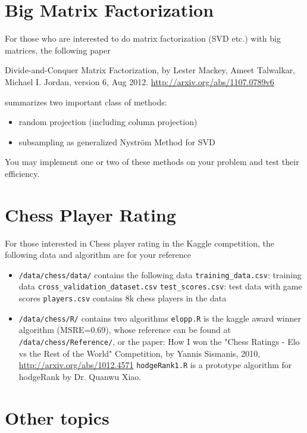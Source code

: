 \documentclass[11pt]{article}
\begin{document}
\section{Big Matrix Factorization}

For those who are interested to do matrix factorization (SVD etc.) with big matrices, the following paper

Divide-and-Conquer Matrix Factorization, by Lester Mackey, Ameet Talwalkar, Michael I. Jordan, version 6, Aug 2012. 
\url{http://arxiv.org/abs/1107.0789v6} 

\noindent summarizes two important class of methods:
\begin{itemize}
\item random projection (including column projection)
\item subsampling as generalized Nystr\"{o}m Method for SVD
\end{itemize}

You may implement one or two of these methods on your problem and test their efficiency. 

\section{Chess Player Rating} 

For those interested in Chess player rating in the Kaggle competition, the following data and algorithm are for your reference 
\begin{itemize}
\item \texttt{/data/chess/data/} contains the following data
\subitem \texttt{training\_data.csv}: training data
\subitem \texttt{cross\_validation\_dataset.csv}  
\subitem \texttt{test\_scores.csv}: test data with game scores
\subitem \texttt{players.csv} contains 8k chess players in the data
\item \texttt{/data/chess/R/}  contains two algorithms
\subitem \texttt{elopp.R}  is the kaggle award winner algorithm (MSRE=0.69), whose reference can be found at 
\subitem \texttt{/data/chess/Reference/}, or the paper:  
How I won the "Chess Ratings - Elo vs the Rest of the World" Competition, by Yannis Sismanis, 2010, \url{http://arxiv.org/abs/1012.4571}
\subitem \texttt{hodgeRank1.R} is a prototype algorithm for hodgeRank by Dr. Quanwu Xiao.
\end{itemize}

\section{Other topics}
\end{document}
